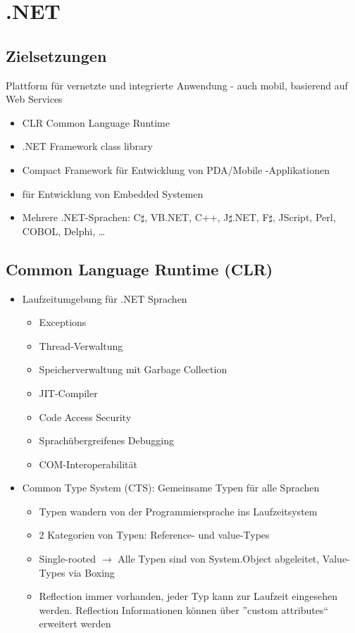 \section{.NET}
\subsection{Zielsetzungen}
Plattform für vernetzte und integrierte Anwendung - auch mobil, basierend auf Web Services
\begin{itemize}
\item CLR Common Language Runtime
\item .NET Framework class library
\item Compact Framework für Entwicklung von PDA/Mobile -Applikationen
\item {} für Entwicklung von Embedded Systemen
\item Mehrere .NET-Sprachen: C$\sharp$, VB.NET, C++, J$\sharp$.NET, F$\sharp$, JScript, Perl, COBOL, Delphi, \dots
\end{itemize}

\subsection{Common Language Runtime (CLR)}
\begin{itemize}
	\item Laufzeitumgebung für .NET Sprachen
		\begin{itemize}
			\item Exceptions
			\item Thread-Verwaltung
			\item Speicherverwaltung mit Garbage Collection
			\item JIT-Compiler
			\item Code Access Security
			\item Sprachübergreifenes Debugging
			\item COM-Interoperabilität
		\end{itemize}
	\item Common Type System (CTS): Gemeinsame Typen für alle Sprachen
		\label{csharpCTS}
		\begin{itemize}
			\item Typen wandern von der Programmiersprache ins Laufzeitsystem
			\item 2 Kategorien von Typen: Reference- und value-Types
			\item Single-rooted $\rightarrow$ Alle Typen sind von System.Object abgeleitet, Value-Types via Boxing
			\item Reflection immer vorhanden, jeder Typ kann zur Laufzeit eingesehen werden.
				Reflection Informationen können über ''custom attributes`` erweitert werden
		\end{itemize}
\end{itemize}


